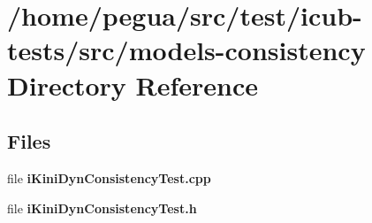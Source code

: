 \section{/home/pegua/src/test/icub-\/tests/src/models-\/consistency Directory Reference}
\label{dir_6355ee7e8e7fccbf90712e6e68524328}
\subsection*{Files}
\begin{DoxyCompactItemize}
\item 
file {\bfseries i\-Kini\-Dyn\-Consistency\-Test.\-cpp}
\item 
file {\bfseries i\-Kini\-Dyn\-Consistency\-Test.\-h}
\end{DoxyCompactItemize}
